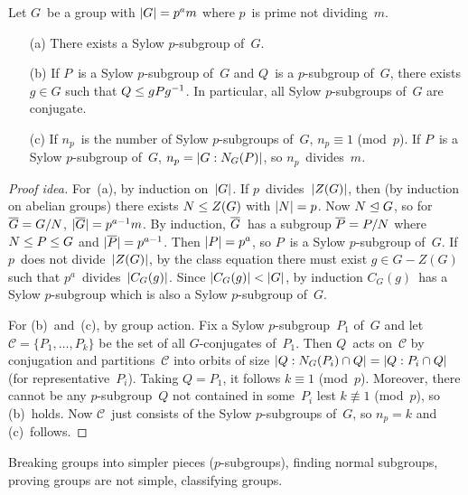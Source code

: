 \begin{thm}[Sylow]
Let \(G\)~be a group with \(\ord{G}=p^a m\) where \(p\)~is prime not dividing~\(m\).
\begin{enumerate}[itemsep=0pt]
\item[(a)] There exists a Sylow \(p\)-subgroup of~\(G\).
\item[(b)] If \(P\)~is a Sylow \(p\)-subgroup of~\(G\) and \(Q\)~is a \(p\)-subgroup of~\(G\), there exists \(g\in G\) such that \(Q\subgroupeq gPg^{-1}\). In particular, all Sylow \(p\)-subgroups of~\(G\) are conjugate.
\item[(c)] If \(n_p\)~is the number of Sylow \(p\)-subgroups of~\(G\), \(n_p\equiv 1\) (mod~\(p\)). If \(P\)~is a Sylow \(p\)-subgroup of~\(G\), \(n_p=\idx{N_G(P)}{G}\), so \(n_p\)~divides~\(m\).
\end{enumerate}
\end{thm}
\begin{proof}[Proof idea]
For~(a), by induction on~\(\ord{G}\). If \(p\)~divides~\(\ord{Z(G)}\), then (by induction on abelian groups) there exists \(N\subgroupeq Z(G)\) with \(\ord{N}=p\). Now \(N\normsubgroupeq G\), so for \(\res{G}=G/N\), \(\ord{\res{G}}=p^{a-1}m\). By induction, \(\res{G}\)~has a subgroup \(\res{P}=P/N\) where \(N\subgroupeq P\subgroupeq G\) and \(\ord{\res{P}}=p^{a-1}\). Then \(\ord{P}=p^a\), so \(P\)~is a Sylow \(p\)-subgroup of~\(G\). If \(p\)~does not divide~\(\ord{Z(G)}\), by the class equation there must exist \(g\in G-Z(G)\) such that \(p^a\)~divides~\(\ord{C_G(g)}\). Since \(\ord{C_G(g)}<\ord{G}\), by induction \(C_G(g)\)~has a Sylow \(p\)-subgroup which is also a Sylow \(p\)-subgroup of~\(G\).

For (b)~and~(c), by group action. Fix a Sylow \(p\)-subgroup~\(P_1\) of~\(G\) and let \(\mathcal{C}=\{P_1,\ldots,P_k\}\) be the set of all \(G\)-conjugates of~\(P_1\). Then \(Q\)~acts on~\(\mathcal{C}\) by conjugation and partitions~\(\mathcal{C}\) into orbits of size \(\idx{N_G(P_i)\sect Q}{Q}=\idx{P_i\sect Q}{Q}\) (for representative~\(P_i\)). Taking \(Q=P_1\), it follows \(k\equiv1\) (mod~\(p\)). Moreover, there cannot be any \(p\)-subgroup~\(Q\) not contained in some~\(P_i\) lest \(k\not\equiv1\) (mod~\(p\)), so (b)~holds. Now \(\mathcal{C}\)~just consists of the Sylow \(p\)-subgroups of~\(G\), so \(n_p=k\) and (c)~follows.
\end{proof}
\begin{app}
Breaking groups into simpler pieces (\(p\)-subgroups), finding normal subgroups, proving groups are not simple, classifying groups.
\end{app}

